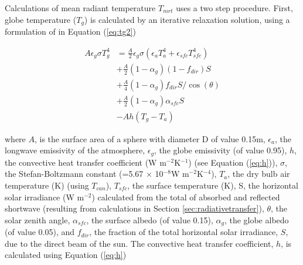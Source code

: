 \documentclass[final,3p,times,authoryear]{elsarticle}
\begin{document}

Calculations of mean radiant temperature $T_{mrt}$ uses a two step procedure. First, globe temperature ($T_{g}$) is calculated by an iterative relaxation solution, using a formulation of \cite{Liljegren2008} in Equation (\ref{eq:tg2}) 

\begin{equation}\label{eq:tg2}
\begin{split}
A\epsilon_{g}\sigma T_{g}^{4} &= \frac{A}{2} \epsilon_{g}\sigma( \epsilon_{a} T_{a}^{4} +  \epsilon_{sfc} T_{sfc}^{4} ) \\
&+ \frac{A}{2}( 1-\alpha_{g})(1-f_{dir})S  \\
&+ \frac{A}{4}( 1-\alpha_{g})f_{dir}S /\cos(\theta) \\
&+ \frac{A}{2}( 1-\alpha_{g})\alpha_{sfc}S \\
&- Ah(T_{g}-T_{a})   
\end{split}
\end{equation}

where $A$, is the surface area of a sphere with diameter D of value 0.15m,
$\epsilon_{a}$, the longwave emissivity of the atmosphere, 
$\epsilon_{g}$, the globe emissivity (of value 0.95), 
$h$, the convective heat transfer coefficient (W m$^{-2}$K$^{-1}$) (see Equation (\ref{eq:h})), 
$\sigma$, the Stefan-Boltzmann constant (=5.67 $\times$ 10$^{-8}$W m$^{-2}$K$^{-4}$), 
$T_{a}$, the dry bulb air temperature (K) (using $T_{can}$), 
$T_{sfc}$, the surface temperature (K), 
S, the horizontal solar irradiance (W m$^{-2}$) calculated from the total of absorbed and reflected shortwave (resulting from calculations in Section \ref{sec:radiativetransfer}), 
$\theta$, the solar zenith angle, 
$\alpha_{sfc}$, the surface albedo (of value 0.15),  
$\alpha_{g}$, the globe albedo (of value 0.05), and 
$f_{dir}$, the fraction of the total horizontal solar irradiance, $S$, due to the direct
beam of the sun. The convective heat transfer coefficient, $h$, is calculated using Equation (\ref{eq:h})
\end{document}
